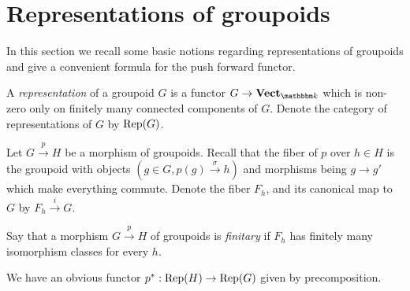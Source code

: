 \section{Representations of groupoids}
\label{GroupoidRep}
In this section we recall some basic notions regarding representations of groupoids and give a convenient formula for the push forward functor.

\begin{Definition}
A \emph{representation} of a groupoid $G$ is a functor $G\to \Vect_{\field}$ which is non-zero only on finitely many connected components of $G$. Denote the category of representations of $G$ by $\operatorname{Rep}(G)$.
\end{Definition}

\begin{Definition}
\label{2Fiber}
Let $G\xrightarrow{p} H$ be a morphism of groupoids. Recall that the fiber of $p$ over $h\in H$ is the groupoid with objects $(g\in G, p(g)\xrightarrow{\sigma} h)$ and morphisms being $g\to g'$ which make everything commute. Denote the fiber $F_h$, and its canonical map to $G$ by $F_h\xrightarrow{i}G$. 
\end{Definition}
\begin{Definition}
Say that a morphism $G\xrightarrow{p} H$ of groupoids is \emph{finitary} if $F_h$ has finitely many isomorphism classes for every $h$. 
\end{Definition}

We have an obvious functor $p^*:\operatorname{Rep}(H)\to\operatorname{Rep}(G)$ given by precomposition.

